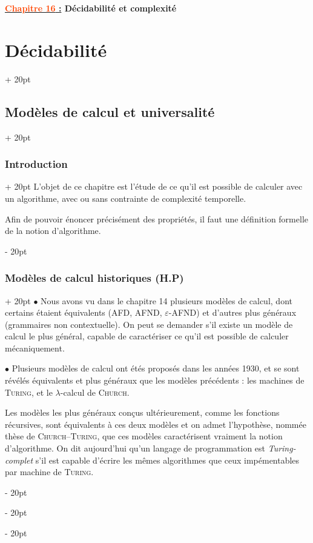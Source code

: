 \documentclass[a4paper, 12pt, twoside]{article}
\newcommand{\Emph}{\textcolor{ff4500}}
\newcommand{\ind}[1][20pt]{\advance\leftskip + #1}
\newcommand{\deind}[1][20pt]{\advance\leftskip - #1}
\newenvironment{indt}[2][20pt]{#2 \par \ind[#1]}{\par \deind} %
\newcommand{\thetitle}[2]{\begin{center}\textbf{{\LARGE \underline{\Emph{#1} :}} {\Large #2}}\end{center}}
\begin{document}
    
    \thetitle{Chapitre 16}{Décidabilité et complexité}
    
    \tableofcontents
    \newpage
    
    \begin{indt}{\section{Décidabilité}}
        \begin{indt}{\subsection{Modèles de calcul et universalité}}
            \begin{indt}{\subsubsection{Introduction}}
                L'objet de ce chapitre est l'étude de ce qu'il est possible de calculer avec un algorithme, avec ou sans contrainte de complexité temporelle.

                Afin de pouvoir énoncer précisément des propriétés, il faut une définition formelle de la notion d'algorithme.
            \end{indt}

            \begin{indt}{\subsubsection{Modèles de calcul historiques (H.P)}}
                $\bullet$ Nous avons vu dans le chapitre 14 plusieurs modèles de calcul, dont certains étaient équivalents (AFD, AFND, $\varepsilon$-AFND) et d'autres plus généraux (grammaires non contextuelle).
                On peut se demander s'il existe un modèle de calcul le plus général, capable de caractériser ce qu'il est possible de calculer mécaniquement.

                $\bullet$ Plusieurs modèles de calcul ont étés proposés dans les années 1930, et se sont révélés équivalents et plus généraux que les modèles précédents : les machines de \textsc{Turing}, et le $\lambda$-calcul de \textsc{Church}.

                Les modèles les plus généraux conçus ultérieurement, comme les fonctions récursives, sont équivalents à ces deux modèles et on admet l'hypothèse, nommée thèse de \textsc{Church}--\textsc{Turing}, que ces modèles caractérisent vraiment la notion d'algorithme.
                On dit aujourd'hui qu'un langage de programmation est \emph{Turing-complet} s'il est capable d'écrire les mêmes algorithmes que ceux impémentables par machine de \textsc{Turing}.


\end{indt}
\end{indt}
\end{indt}
\end{document}
